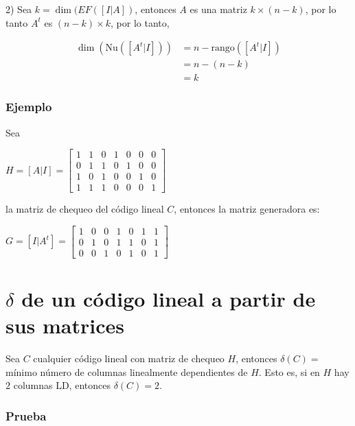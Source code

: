 \documentclass[10pt,a4paper]{article}
\begin{document}
2) Sea $k = \dim(EF(\left[I|A\right])$, entonces $A$ es una matriz $k \times (n - k)$, por lo tanto $A^t$ es $(n-k)\times k$, por lo tanto,

\begin{center}
\begin{align*} \dim(\text{Nu}(\left[ A^t | I \right])) &=n- \text{rango}(\left[A^t | I\right])\\ &= n - (n-k)\\ &= k\end{align*}
\end{center}

\subsubsection*{Ejemplo}

Sea

\begin{center}
$H = \left[ A| I \right] = \left[ \begin{array}{ccc|cccc} 1&1&0&1&0&0&0\\ 0&1&1&0&1&0&0\\ 1&0&1&0&0&1&0\\ 1&1&1&0&0&0&1 \end{array} \right]$
\end{center}

la matriz de chequeo del código lineal $C$, entonces la matriz generadora es:

\begin{center}
$G = \left[I|A^t\right] = \left[ \begin{array}{ccc|cccc} 1&0&0&1&0&1&1\\ 0&1&0&1&1&0&1\\ 0&0&1&0&1&0&1 \end{array} \right]$
\end{center}

\section*{$\delta$ de un código lineal a partir de sus matrices}

Sea $C$ cualquier código lineal con matriz de chequeo $H$, entonces $\delta(C) = $ mínimo número de columnas linealmente dependientes de $H$. Esto es, si en $H$ hay $2 $ columnas LD, entonces $\delta(C) = 2$.

\subsubsection*{Prueba}
\end{document}
